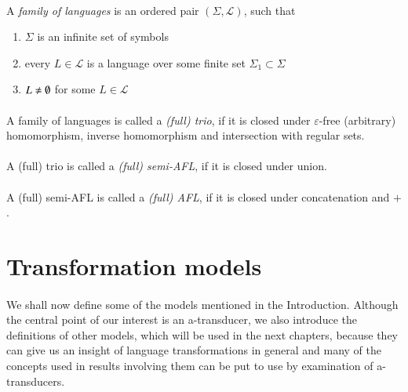 \paragraph{}
 A \emph{family of languages} is an ordered pair $(\Sigma ,\mathcal{L} )$, such that
\begin{enumerate}
\item $\Sigma $ is an infinite set of symbols
\item every $L\in \mathcal{L} $ is a language over some finite set $\Sigma_1 \subset \Sigma $
\item $L \neq \es $ for some $L \in \mathcal{L} $
\end{enumerate}

\paragraph{}
 A family of languages is called a \emph{(full) trio}, if it is closed under $\varepsilon $-free (arbitrary) homomorphism, inverse homomorphism and intersection with regular sets.

\paragraph{}
 A (full) trio is called a \emph{(full) semi-AFL}, if it is closed under union.

\paragraph{}
 A (full) semi-AFL is called a \emph{(full) AFL}, if it is closed under concatenation and $+$.

\section{Transformation models}
\paragraph{}
We shall now define some of the models mentioned in the Introduction. Although the central point of our interest is an a-transducer, we also introduce the definitions of other models, which will be used in the next chapters, because they can give us an insight of language transformations in general and many of the concepts used in results involving them can be put to use by examination of a-transducers.

